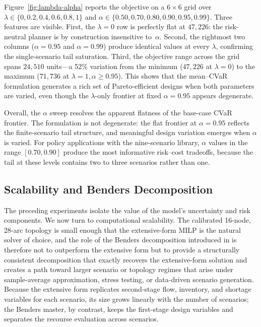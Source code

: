 \documentclass[final,3p,authoryear]{elsarticle}
\theoremstyle{definition}
\begin{document}
Figure~\ref{fig:lambda-alpha} reports the objective on a
\(6\times 6\) grid over \(\lambda\in\{0,0.2,0.4,0.6,0.8,1\}\) and
\(\alpha\in\{0.50,0.70,0.80,0.90,0.95,0.99\}\). Three features are
visible. First, the \(\lambda=0\) row is perfectly flat at \(47{,}226\):
the risk-neutral planner is by construction insensitive to~\(\alpha\).
Second, the rightmost two columns (\(\alpha=0.95\) and \(\alpha=0.99\))
produce identical values at every \(\lambda\), confirming the
single-scenario tail saturation. Third, the objective range across the
grid spans \(24{,}510\) units—a 52\% variation from the minimum
(\(47{,}226\) at \(\lambda=0\)) to the maximum (\(71{,}736\) at
\(\lambda=1,\alpha\ge 0.95\)). This shows that the mean--CVaR
formulation generates a rich set of Pareto-efficient designs when both
parameters are varied, even though the \(\lambda\)-only frontier at
fixed \(\alpha=0.95\) appears degenerate.
 
Overall, the \(\alpha\) sweep resolves the apparent flatness of the
base-case CVaR frontier. The formulation is not degenerate: the flat
frontier at \(\alpha=0.95\) reflects the finite-scenario tail structure,
and meaningful design variation emerges when \(\alpha\) is varied. For
policy applications with the nine-scenario library, \(\alpha\) values
in the range \([0.70,0.90]\) produce the most informative risk--cost
tradeoffs, because the tail at these levels contains two to three
scenarios rather than one.




\subsection{Scalability and Benders Decomposition}
\label{sec:benders-scaling}
 
The preceding experiments isolate the value of the model's uncertainty
and risk components. We now turn to computational scalability. The
calibrated 16-node, 28-arc topology is small enough that the
extensive-form MILP is the natural solver of choice, and the role of
the Benders decomposition introduced in
 is therefore not to outperform the extensive form
but to provide a structurally consistent decomposition that exactly
recovers the extensive-form solution and creates a path toward larger
scenario or topology regimes that arise under sample-average
approximation, stress testing, or data-driven scenario generation.
Because the extensive form replicates second-stage flow, inventory, and
shortage variables for each scenario, its size grows linearly with the
number of scenarios; the Benders master, by contrast, keeps the
first-stage design variables and separates the recourse evaluation
across scenarios.
 
\end{document}
